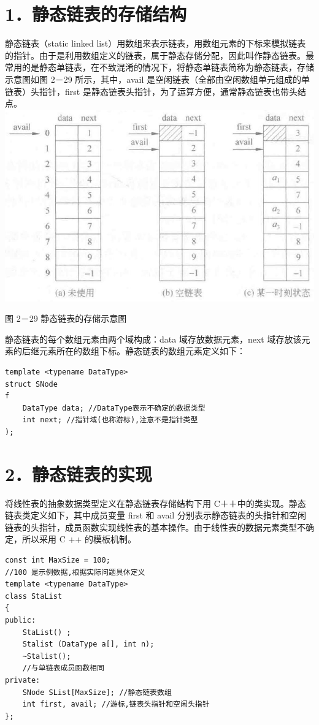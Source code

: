 \documentclass[10pt]{article}
\begin{document}
\section*{1．静态链表的存储结构}
静态链表（static linked list）用数组来表示链表，用数组元素的下标来模拟链表的指针。由于是利用数组定义的链表，属于静态存储分配，因此叫作静态链表。最常用的是静态单链表，在不致混淆的情况下，将静态单链表简称为静态链表，存储示意图如图 2－29 所示，其中，avail 是空闲链表（全部由空闲数组单元组成的单链表）头指针，first 是静态链表头指针，为了运算方便，通常静态链表也带头结点。\\
\includegraphics[max width=\textwidth, center]{2025_06_06_704745ea57b15b2333e5g-065}

图 2－29 静态链表的存储示意图

静态链表的每个数组元素由两个域构成：data 域存放数据元素，next 域存放该元素的后继元素所在的数组下标。静态链表的数组元素定义如下：

\begin{verbatim}
template <typename DataType>
struct SNode
f
    DataType data; //DataType表示不确定的数据类型
    int next; //指针域(也称游标),注意不是指针类型
);
\end{verbatim}

\section*{2．静态链表的实现}
将线性表的抽象数据类型定义在静态链表存储结构下用 C＋＋中的类实现。静态链表类定义如下，其中成员变量 first 和 avail 分别表示静态链表的头指针和空闲链表的头指针，成员函数实现线性表的基本操作。由于线性表的数据元素类型不确定，所以采用 C ++ 的模板机制。

\begin{verbatim}
const int MaxSize = 100;
//100 是示例数据,根据实际问题具休定义
template <typename DataType>
class StaList
{
public:
    StaList() ;
    Stalist (DataType a[], int n);
    ~Stalist();
    //与单链表成员函数相同
private:
    SNode SList[MaxSize]; //静态链表数组
    int first, avail; //游标,链表头指针和空闲头指针
};
\end{verbatim}
\end{document}
